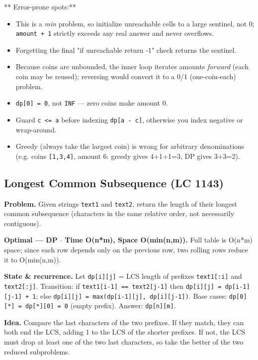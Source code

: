 \documentclass[11pt]{article}
\providecommand{\tightlist}{\setlength{\itemsep}{1pt}\setlength{\parskip}{0pt}}
\begin{document}
** Error-prone spots:**

\begin{itemize}
\tightlist
\item
  This is a \emph{min} problem, so initialize unreachable cells to a large sentinel, not 0; \texttt{amount\ +\ 1} strictly exceeds any real answer and never overflows.
\item
  Forgetting the final "if unreachable return -1" check returns the sentinel.
\item
  Because coins are unbounded, the inner loop iterates amounts \emph{forward} (each coin may be reused); reversing would convert it to a 0/1 (one-coin-each) problem.
\item
  \texttt{dp{[}0{]}\ =\ 0}, not \texttt{INF} --- zero coins make amount 0.
\item
  Guard \texttt{c\ \textless{}=\ a} before indexing \texttt{dp{[}a\ -\ c{]}}, otherwise you index negative or wrap-around.
\item
  Greedy (always take the largest coin) is wrong for arbitrary denominations (e.g. coins \texttt{{[}1,3,4{]}}, amount 6: greedy gives 4+1+1=3, DP gives 3+3=2).
\end{itemize}

\subsection{Longest Common Subsequence (LC 1143)}\label{longest-common-subsequence-lc-1143}

\textbf{Problem.} Given strings \texttt{text1} and \texttt{text2}, return the length of their longest common subsequence (characters in the same relative order, not necessarily contiguous).

\textbf{Optimal --- DP \(\cdot\) Time O(n*m), Space O(min(n,m)).} Full table is O(n*m) space; since each row depends only on the previous row, two rolling rows reduce it to O(min(n,m)).

\textbf{State \& recurrence.} Let \texttt{dp{[}i{]}{[}j{]}} = LCS length of prefixes \texttt{text1{[}:i{]}} and \texttt{text2{[}:j{]}}. Transition: if \texttt{text1{[}i-1{]}\ ==\ text2{[}j-1{]}} then \texttt{dp{[}i{]}{[}j{]}\ =\ dp{[}i-1{]}{[}j-1{]}\ +\ 1}; else \texttt{dp{[}i{]}{[}j{]}\ =\ max(dp{[}i-1{]}{[}j{]},\ dp{[}i{]}{[}j-1{]})}. Base cases: \texttt{dp{[}0{]}{[}*{]}\ =\ dp{[}*{]}{[}0{]}\ =\ 0} (empty prefix). Answer: \texttt{dp{[}n{]}{[}m{]}}.

\textbf{Idea.} Compare the last characters of the two prefixes. If they match, they can both end the LCS, adding 1 to the LCS of the shorter prefixes. If not, the LCS must drop at least one of the two last characters, so take the better of the two reduced subproblems.
\end{document}
